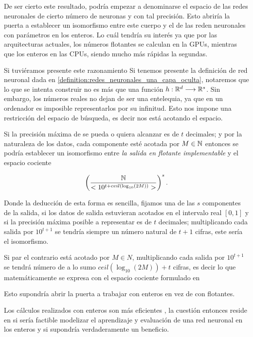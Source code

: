 De ser cierto este resultado, podría empezar a denominarse el espacio de las redes neuronales de cierto número de neuronas y con tal precisión. Esto abriría la puerta a establecer un isomorfismo entre este cuerpo y el de las reden neuronales con parámetros en los enteros.  Lo cuál tendría su interés ya que por las arquitecturas actuales, los números flotantes se calculan en la GPUs, mientras que los enteros en las CPUs, siendo mucho más rápidas la segundas. 

Si tuviéramos presente este razonamiento 
Si tenemos presente la definición de red neuronal dada en \ref{definition:redes_neuronales_una_capa_oculta}, notaremos que lo que se intenta construir no es más que una función $h: \mathbb{R}^d \longrightarrow \mathbb{R}^s$. Sin embargo, los números reales no dejan de ser una entelequia, ya que en un ordenador es imposible representarlos por su infinitud. Esto nos impone una restricción del espacio de búsqueda, es decir nos está acotando el espacio. 

 Si la precisión máxima de se pueda o quiera alcanzar es de $t$ decimales;
 y por la naturaleza de los datos,
 cada componente esté acotada por $M \in \mathbb{N}$
 entonces se podría 
establecer un isomorfismo entre \textit{la salida en flotante implementable} y el espacio cociente 

\begin{equation}%
    \left( \frac{\N}{<10^{t + ceil( \log_{10}(2 M))}>} \right)^s. 
\end{equation}


Donde la deducción de esta forma es sencilla, 
fijamos una de las $s$ componentes de la salida, si los datos de salida estuvieran acotados en el 
intervalo real $[0,1]$ y si la precisión máxima 
posible a representar es de $t$ decimales; 
multiplicando cada salida por $10^{t+1}$ se tendría siempre un número natural de $t+1$ cifras, este sería el isomorfismo. 

Si par el contrario está acotado por $M \in N$, multiplicando cada salida por $10^{t+1}$ se tendrá número de a lo sumo $ceil(\log_{10}(2 M))+ t$ cifras, es decir lo que matemáticamente se expresa con el espacio cociente formulado en
 
Esto supondría abrir la puerta a trabajar con enteros en vez de con flotantes. 

Los cálculos realizados con enteros son más eficientes %
, la cuestión entonces reside en si sería factible modelizar el aprendizaje y evaluación de una red neuronal en los enteros 
y si supondría verdaderamente un beneficio. 
